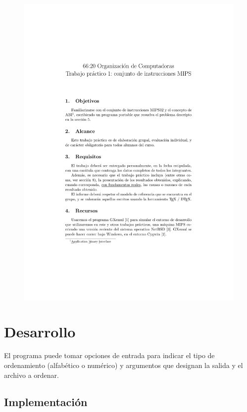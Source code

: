 \documentclass[a4paper, 12pt]{article}
\begin{document}
	\newpage
	\begin{figure}[H]
		\centering
		\includegraphics[scale=1, page = 5, clip, trim=20mm 36mm 20mm 20mm]{files/enunciado.pdf}
	\end{figure}
	
	\section{Desarrollo}
	
		El programa puede tomar opciones de entrada para indicar el tipo de ordenamiento (alfabético o numérico) y argumentos que designan la salida y el archivo a ordenar.
		
	\subsection{Implementación}
		
\end{document}
